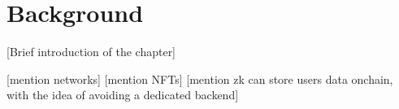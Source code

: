 \chapter{Background}
 [Brief introduction of the chapter]




[mention networks]
[mention NFTs]
[mention zk can store users data onchain, with the idea of avoiding a dedicated backend]
